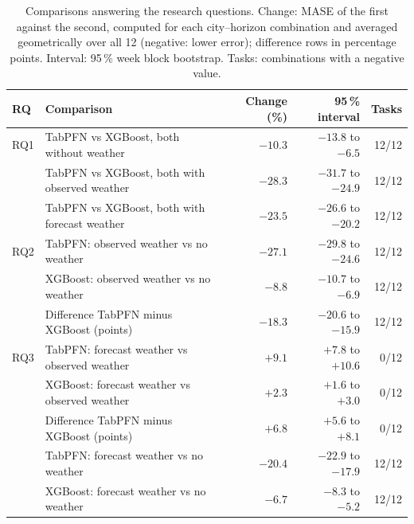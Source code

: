 \begin{table}[ht!]
\centering
\caption{Comparisons answering the research questions. Change: MASE of the first against the second, computed for each city--horizon combination and averaged geometrically over all 12 (negative: lower error); difference rows in percentage points. Interval: 95\,\% week block bootstrap. Tasks: combinations with a negative value.}
\label{tab:rq_intervals}
{\small
\begin{tabular}{llrrr}
\toprule
RQ & Comparison & Change (\%) & 95\,\% interval & Tasks \\
\midrule
RQ1 & TabPFN vs XGBoost, both without weather & $-10.3$ & $-13.8$ to $-6.5$ & 12/12 \\
 & TabPFN vs XGBoost, both with observed weather & $-28.3$ & $-31.7$ to $-24.9$ & 12/12 \\
 & TabPFN vs XGBoost, both with forecast weather & $-23.5$ & $-26.6$ to $-20.2$ & 12/12 \\
\midrule
RQ2 & TabPFN: observed weather vs no weather & $-27.1$ & $-29.8$ to $-24.6$ & 12/12 \\
 & XGBoost: observed weather vs no weather & $-8.8$ & $-10.7$ to $-6.9$ & 12/12 \\
 & Difference TabPFN minus XGBoost (points) & $-18.3$ & $-20.6$ to $-15.9$ & 12/12 \\
\midrule
RQ3 & TabPFN: forecast weather vs observed weather & $+9.1$ & $+7.8$ to $+10.6$ & 0/12 \\
 & XGBoost: forecast weather vs observed weather & $+2.3$ & $+1.6$ to $+3.0$ & 0/12 \\
 & Difference TabPFN minus XGBoost (points) & $+6.8$ & $+5.6$ to $+8.1$ & 0/12 \\
 & TabPFN: forecast weather vs no weather & $-20.4$ & $-22.9$ to $-17.9$ & 12/12 \\
 & XGBoost: forecast weather vs no weather & $-6.7$ & $-8.3$ to $-5.2$ & 12/12 \\
\bottomrule
\end{tabular}
}
\end{table}
